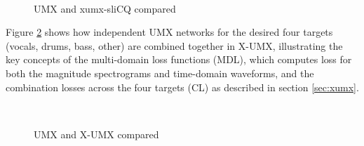 \documentclass[report.tex]{subfiles}
\begin{document}
\begin{figure}[ht]
	\centering
	\\
	\caption{UMX and xumx-sliCQ compared}
	\label{fig:umxandxumxslicq}
\end{figure}

Figure \ref{fig:xumxcl} shows how independent UMX networks for the desired four targets (vocals, drums, bass, other) are combined together in X-UMX, illustrating the key concepts of the multi-domain loss functions (MDL), which computes loss for both the magnitude spectrograms and time-domain waveforms, and the combination losses across the four targets (CL) as described in section \ref{sec:xumx}.

\begin{figure}[ht]
	\centering
	\\
	\caption{UMX and X-UMX compared}
	\label{fig:xumxcl}
\end{figure}
\end{document}
